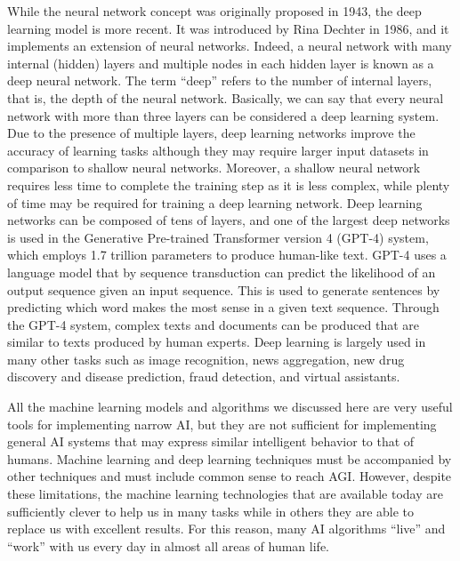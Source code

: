 While the neural network concept was originally proposed in 1943, the deep learning model is more recent. It was introduced by Rina Dechter in 1986, and it implements an extension of neural networks. Indeed, a neural network with many internal (hidden) layers and multiple nodes in each hidden layer is known as a deep neural network. The term ``deep'' refers to the number of internal layers, that is, the depth of the neural network. Basically, we can say that every neural network with more than three layers can be considered a deep learning system. Due to the presence of multiple layers, deep learning networks improve the accuracy of learning tasks although they may require larger input datasets in comparison to shallow neural networks. Moreover, a shallow neural network requires less time to complete the training step as it is less complex, while plenty of time may be required for training a deep learning network. Deep learning networks can be composed of tens of layers, and one of the largest deep networks is used in the Generative Pre-trained Transformer version 4 (GPT-4) system, which employs 1.7 trillion parameters to produce human-like text. GPT-4 uses a language model that by sequence transduction can predict the likelihood of an output sequence given an input sequence. This is used to generate sentences by predicting which word makes the most sense in a given text sequence. Through the GPT-4 system, complex texts and documents can be produced that are similar to texts produced by human experts. Deep learning is largely used in many other tasks such as image recognition, news aggregation, new drug discovery and disease prediction, fraud  detection, and virtual assistants.

All the machine learning models and algorithms we discussed here are very useful tools for implementing narrow AI, but they are not sufficient for implementing general AI systems that may express similar intelligent behavior to that of humans. Machine learning and deep learning techniques must be accompanied by other techniques and must include common sense to reach AGI. However, despite these limitations, the machine learning technologies that are available  today are sufficiently clever to help us in many tasks while in others they are able to replace us with excellent results. For this reason, many AI algorithms ``live'' and ``work'' with us every day in almost all areas of human life.



